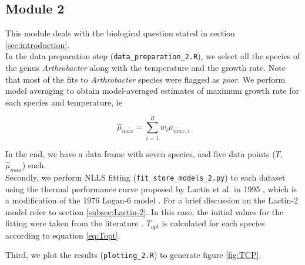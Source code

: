 \documentclass[titlepage,11pt]{article}
\begin{document}
\begin{linenumbers}
			\subsection{Module 2}
			This module deals with the biological question stated in section \ref{sec:introduction}. \\
			In the data preparation step (\verb|data_preparation_2.R|), we select all the species of the genus \textit{Arthrobacter} along with the temperature and the growth rate. Note that most of the fits to \textit{Arthrobacter} species were flagged as \textit{poor}. We perform model averaging to obtain model-averaged estimates of maximum growth rate for each species and temperature, ie
			\begin{linenomath*}
				\begin{equation}
				\hat{\mu}_{max} = \sum\limits_{i = 1}^{R} w_i\mu_{max, i}
				\end{equation}
			\end{linenomath*}
			In the end, we have a data frame with seven species, and five data points ($ T $, $ \hat{\mu}_{max} $) each. \\
			Secondly, we perform NLLS fitting (\verb|fit_store_models_2.py|) to each dataset using the thermal performance curve proposed by Lactin et al. in 1995 \cite{Lactin1995}, which is a modification of the 1976 Logan-6 model \cite{Logan1976}. For a brief discussion on the Lactin-2 model refer to section \ref{subsec:Lactin-2}. In this case, the initial values for the fitting were taken from the literature \cite{Lactin1995}. $ T_{opt} $ is calculated for each species according to equation \ref{eq:Topt}.
			
			Third, we plot the results (\verb|plotting_2.R|) to generate figure \ref{fig:TCP}.

\end{linenumbers}
\end{document}
